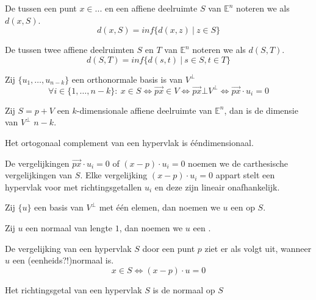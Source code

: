 \documentclass[main.tex]{subfiles}
\begin{document}
\begin{de}
  De  tussen een punt $x\in ...$ en een affiene deelruimte $S$ van $\mathbb{E}^{n}$ noteren we als $d(x,S)$.
  \[ d(x,S) = inf\{ d(x,z)\ |\ z \in S \} \]
\end{de}

\begin{de}
  De  tussen twee affiene deelruimten $S$ en $T$ van $\mathbb{E}^{n}$ noteren we als $d(S,T)$.
  \[ d(S,T) = inf\{ d(s,t) \ |\ s\in S, t\in T \} \]
\end{de}

\begin{st}
  Zij $\{u_{1}, \dotsc, u_{n-k}\}$ een orthonormale basis is van $V^{\bot}$
  \[ \forall i \in \{ 1, \dotsc, n-k \} :\ x \in S \Leftrightarrow \overrightarrow{px} \in V \Leftrightarrow \overrightarrow{px} \bot V^{\bot} \Leftrightarrow \overrightarrow{px} \cdot u_{i} = 0 \]
\end{st}

\begin{st}
  Zij $S=p+V$ een $k$-dimensionale affiene deelruimte van $\mathbb{E}^{n}$, dan is de dimensie van $V^{\bot}$ $n-k$.
\end{st}

\begin{gev}
  Het ortogonaal complement van een hypervlak is \'e\'endimensionaal.
\end{gev}

\begin{de}
  De vergelijkingen $\overrightarrow{px} \cdot u_{i} = 0$ of $(x-p) \cdot u_{i} = 0$ noemen we de carthesische vergelijkingen van $S$. Elke vergelijking $(x-p)\cdot u_{i} = 0$ appart stelt een hypervlak voor met richtingsgetallen $u_{i}$ en deze zijn lineair onafhankelijk.
\end{de}

\begin{de}
  Zij $\{u\}$ een basis van $V^{\bot}$ met \'e\'en elemen, dan noemen we $u$ een  op $S$.
\end{de}

\begin{de}
  Zij $u$ een normaal van lengte $1$, dan noemen we $u$ een .
\end{de}

\begin{st}
  De vergelijking van een hypervlak $S$ door een punt $p$ ziet er als volgt uit, wanneer $u$ een (eenheids?!)normaal is.
  \[ x \in S \Leftrightarrow (x-p) \cdot u = 0 \]
\end{st}

\begin{gev}
  Het richtingsgetal van een hypervlak $S$ is de normaal op $S$
\end{gev}
\end{document}
